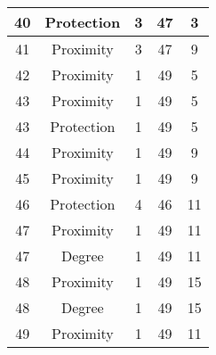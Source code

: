 \documentclass[results.tex]{subfiles}
\begin{document}
\begin{center}
\begin{tabular}{| c || c | c | c | c |}
            \hline
            40                      & Protection                   & 3                      & 47                      & 3                    \\
            \hline
            41                      & Proximity                    & 3                      & 47                      & 9                    \\
            \hline
            42                      & Proximity                    & 1                      & 49                      & 5                    \\
            \hline
            43                      & Proximity                    & 1                      & 49                      & 5                    \\
            \hline
            43                      & Protection                   & 1                      & 49                      & 5                    \\
            \hline
            44                      & Proximity                    & 1                      & 49                      & 9                    \\
            \hline
            45                      & Proximity                    & 1                      & 49                      & 9                    \\
            \hline
            46                      & Protection                   & 4                      & 46                      & 11                   \\
            \hline
            47                      & Proximity                    & 1                      & 49                      & 11                   \\
            \hline
            47                      & Degree                       & 1                      & 49                      & 11                   \\
            \hline
            48                      & Proximity                    & 1                      & 49                      & 15                   \\
            \hline
            48                      & Degree                       & 1                      & 49                      & 15                   \\
            \hline
            49                      & Proximity                    & 1                      & 49                      & 11                   \\
            \hline
        \end{tabular}
    \end{center}
\end{document}

